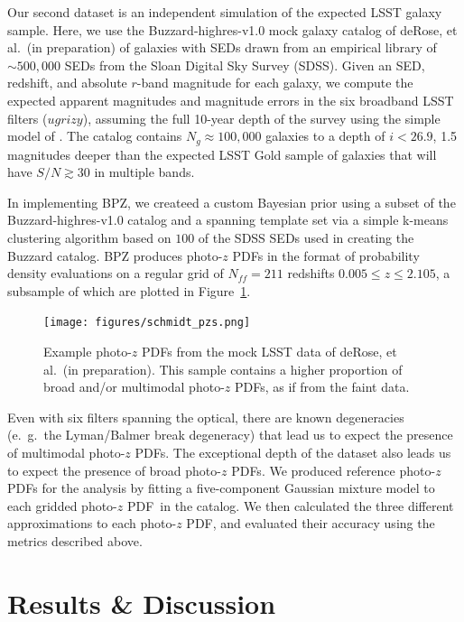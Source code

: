 \documentclass[\docopts]{\docclass}
\newcommand{\pz}{photo-$z$ PDF}
\newcommand{\ssdata}{faint\xspace}
\begin{document}
Our second dataset is an independent simulation of the expected LSST galaxy 
sample.
Here, we use the Buzzard-highres-v1.0 mock galaxy catalog of deRose, et al.\ 
(in preparation) of galaxies with SEDs drawn from an empirical library of 
$\sim500,000$ SEDs from the Sloan Digital Sky Survey (SDSS).
Given an SED, redshift, and absolute $r$-band magnitude for each galaxy, we 
compute the expected apparent magnitudes and magnitude errors in the six 
broadband LSST filters ($ugrizy$), assuming the full 10-year depth of the 
survey using the simple model of \citet{ivezic_lsst:_2008}.
The catalog contains $N_{g}\approx100,000$ galaxies to a depth of $i<26.9$, 1.5 
magnitudes deeper than the expected LSST Gold sample of galaxies that will have 
$S/N\gtrsim30$ in multiple bands.

In implementing BPZ, we createed a custom Bayesian prior using a subset of the 
Buzzard-highres-v1.0 catalog and a spanning template set via a simple k-means 
clustering algorithm based on $100$ of the SDSS SEDs used in creating the 
Buzzard catalog.
BPZ produces \pz s in the format of probability density evaluations on a 
regular grid of $N_{ff}=211$ redshifts $0.005\leq z\leq2.105$, a subsample of 
which are plotted in Figure~\ref{fig:schmidt_pzs}.

\begin{figure}
  \begin{center}
    \texttt{[image: figures/schmidt\_pzs.png]}
    \caption{Example \pz s from the mock LSST data of deRose, et al.\ (in 
preparation).
    This sample contains a higher proportion of broad and/or multimodal \pz s, 
as if from the \ssdata data.
    \label{fig:schmidt_pzs}}
  \end{center}
\end{figure}

Even with six filters spanning the optical, there are known degeneracies 
(e.~g.~the Lyman/Balmer break degeneracy) that lead us to expect the presence 
of multimodal \pz s.
The exceptional depth of the dataset also leads us to expect the presence of 
broad \pz s.
We produced reference \pz s for the analysis by fitting a five-component 
Gaussian mixture model to each gridded \pz\ in the catalog.
We then calculated the three different approximations to each \pz, and 
evaluated their accuracy using the metrics described above.


\section{Results \& Discussion}
\label{sec:results}
\end{document}
